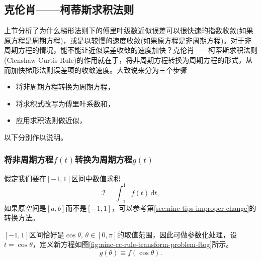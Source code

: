 \subsection{克伦肖——柯蒂斯求积法则}
\label{sec:ninc-cc-quadrature-rule}
上节分析了为什么梯形法则下的傅里叶级数近似误差可以很快速的指数收敛(如果原方程是周期方程)，或是以较慢的速度收敛(如果原方程是非周期方程)。对于非周期方程的情况，能不能让近似误差收敛的速度加快？克伦肖——柯蒂斯求积法则(Clenshaw-Curtis Rule)的作用就在于，将非周期方程转换为周期方程的形式，从而加快梯形法则误差项的收敛速度。大致说来分为三个步骤
\begin{itemize}
  \item 将非周期方程转换为周期方程，
  \item 将求积式改写为傅里叶系数和，
  \item 应用求积法则做近似，
\end{itemize}
以下分别作以说明。

\subsubsection{将非周期方程$f(t)$转换为周期方程$g(t)$}
\label{sec:ninc-cc-rule-transform}
假定我们要在$[-1,1]$区间中数值求积
\begin{equation}
  \label{eq:ninc-cc-rule-transform-problem}
  \mathcal{I} = \int_{-1}^{1} f(t) \, \mathrm{d} t,
\end{equation}
如果原空间是$[a,b]$而不是$[-1,1]$，可以参考第\ref{sec:ninc-tips-improper-change}的转换方法。

$[-1,1]$区间恰好是$\cos \theta, \, \theta \in [0, \pi]$的取值范围，因此可做参数化处理，设$t = \cos \theta$，定义新方程如图\ref{fig:ninc-cc-rule-transform-problem-ftog}所示。
\begin{equation}
  \label{eq:ninc-cc-rule-transform-problem-ftog}
  g(\theta) \equiv f \left( \cos \theta \right).
\end{equation}


